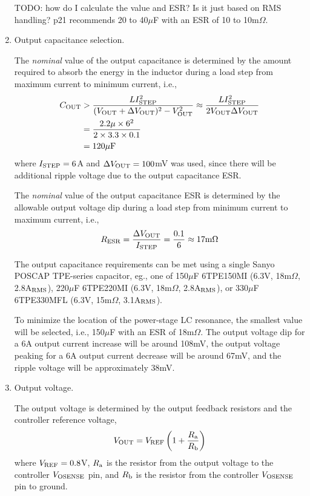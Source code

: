\begin{enumerate}
TODO: how do I calculate the value and ESR? Is it just based on
RMS handling? p21 recommends 20 to 40$\mu$F with an ESR of 10 
to 10m$\Omega$.

\item Output capacitance selection.

The {\em nominal} value of the output capacitance is determined by 
the amount required to absorb the energy in the inductor during a
load step from maximum current to minimum current, i.e.,
%
\begin{equation}
\begin{split}
C_{\rm OUT} &> \frac{LI_{\rm STEP}^2}
{(V_{\rm OUT} + \Delta V_{\rm OUT})^2 - V_{\rm OUT}^2} 
\approx \frac{LI_{\rm STEP}^2}{2V_{\rm OUT}\Delta V_{\rm OUT}}\\
&= \frac{2.2\mu\times 6^2}{2\times3.3\times0.1}\\
&= 120\mu\text{F}
\end{split}
\end{equation}
%
where $I_{\rm STEP}=6$A and $\Delta V_{\rm OUT} = 100$mV was
used, since there will be additional ripple voltage due to 
the output capacitance ESR.

The {\em nominal} value of the output capacitance ESR is determined by
the allowable output voltage dip during a load step from minimum current
to maximum current, i.e.,
%
\begin{equation}
R_{\rm ESR} = \frac{\Delta V_{\rm OUT}}{I_{\rm STEP}} = 
\frac{0.1}{6} \approx 17\text{m}\Omega
\end{equation}
%

The output capacitance requirements can be met using a single
Sanyo POSCAP TPE-series capacitor, eg., one of
150$\mu$F 6TPE150MI (6.3V, 18m$\Omega$, 2.8A$_{\rm RMS}$),
220$\mu$F 6TPE220MI (6.3V, 18m$\Omega$, 2.8A$_{\rm RMS}$), or
330$\mu$F 6TPE330MFL (6.3V, 15m$\Omega$, 3.1A$_{\rm RMS}$).

To minimize the location of the power-stage LC resonance,
the smallest value will be selected, i.e., 150$\mu$F with 
an ESR of 18m$\Omega$. The output voltage dip for a 6A output
current increase will be around 108mV, the output voltage peaking for
a 6A output current decrease will be around 67mV, and the ripple
voltage will be approximately 38mV.

\item Output voltage.

The output voltage is determined by the output feedback resistors
and the controller reference voltage, 
%
\begin{equation}
V_{\rm OUT} = V_{\rm REF}\left(1+\frac{R_{\rm a}}{R_{\rm b}}\right)
\end{equation}
%
where $V_{\rm REF} = 0.8$V, $R_{\rm a}$ is the resistor from the
output voltage to the controller $V_{\rm OSENSE}$ pin, and 
$R_{\rm b}$ is the resistor from the controller $V_{\rm OSENSE}$ 
pin to ground.


\end{enumerate}
